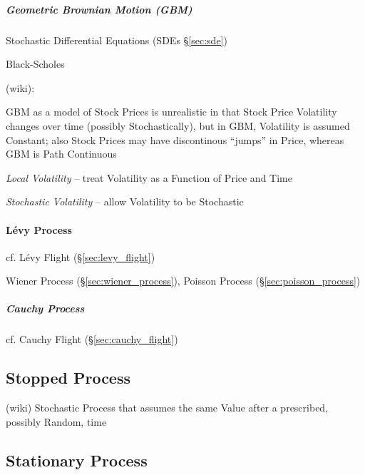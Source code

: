 \subparagraph{Geometric Brownian Motion (GBM)}\label{sec:gbm}\hfill

Stochastic Differential Equations (SDEs \S\ref{sec:sde})

Black-Scholes

(wiki):

GBM as a model of Stock Prices is unrealistic in that Stock Price Volatility
changes over time (possibly Stochastically), but in GBM, Volatility is assumed
Constant; also Stock Prices may have discontinous ``jumps'' in Price, whereas
GBM is Path Continuous

\emph{Local Volatility} -- treat Volatility as a Function of Price and Time

\emph{Stochastic Volatility} -- allow Volatility to be Stochastic



\paragraph{L\'evy Process}\label{sec:levy_process}\hfill

\fist cf. L\'evy Flight (\S\ref{sec:levy_flight})

Wiener Process (\S\ref{sec:wiener_process}), Poisson Process
(\S\ref{sec:poisson_process})



\subparagraph{Cauchy Process}\label{sec:levy_process}\hfill

\fist cf. Cauchy Flight (\S\ref{sec:cauchy_flight})



\subsection{Stopped Process}\label{sec:stopped_process}

(wiki) Stochastic Process that assumes the same Value after a prescribed,
possibly Random, time



\subsection{Stationary Process}\label{sec:stationary_process}

